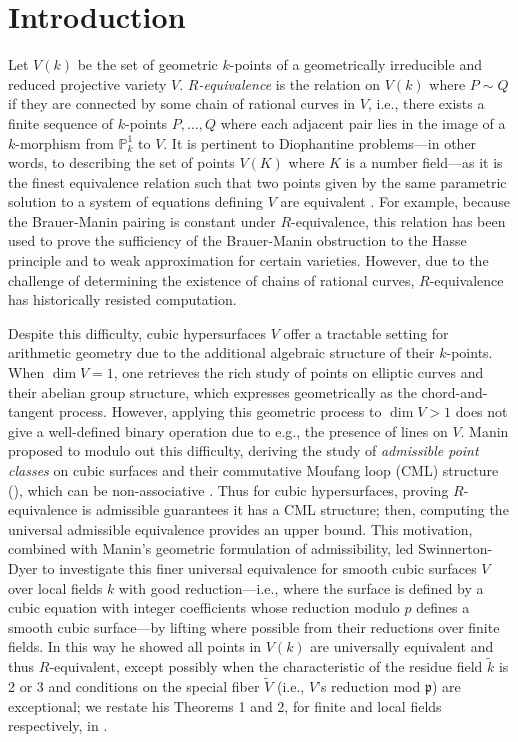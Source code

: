 \documentclass[11pt]{article}
\theoremstyle{definition}
\newcommand{\PP}{\mathbb{P}}
\begin{document}
\section{Introduction}

Let $V(k)$ be the set of geometric $k$-points of a geometrically irreducible and reduced projective variety $V$. \textit{$R$-equivalence} is the relation on $V(k)$ where $P \sim Q$ if they are connected by some  chain of rational curves in $V$, i.e., there exists a finite sequence of $k$-points $P, \dotsc, Q$ where each adjacent pair lies in the image of a $k$-morphism from $\PP^1_k$ to $V$. It is pertinent to Diophantine problems---in other words, to describing the set of points $V(K)$ where $K$ is a number field---as it is the finest equivalence relation such that two points given by the same parametric solution to a system of equations defining $V$ are equivalent \cite{diophantine}. For example, because the Brauer-Manin pairing is constant under $R$-equivalence, this relation has been used to prove the sufficiency of the Brauer-Manin obstruction to the Hasse principle \cite[\S VI]{manin3} and to weak approximation \cite{weak-approx} for certain varieties. However, due to the challenge of determining the existence of chains of rational curves, $R$-equivalence has historically resisted computation.

Despite this difficulty, cubic hypersurfaces $V$ offer a tractable setting for arithmetic geometry due to the additional algebraic structure of their $k$-points. When $\dim V = 1$, one retrieves the rich study of points on elliptic curves and their abelian group structure, which expresses geometrically as the chord-and-tangent process. However, applying this geometric process to $\dim V > 1$ does not give a well-defined binary operation due to e.g., the presence of lines on $V$. Manin \cite{manin1968cubic} proposed to modulo out this difficulty, deriving the study of \textit{admissible point classes} on cubic surfaces and their commutative Moufang loop (CML) structure (), which can be non-associative \cite{dknonassoc}. Thus for cubic hypersurfaces, proving $R$-equivalence is admissible guarantees it has a CML structure; then, computing the universal admissible equivalence provides an upper bound. This motivation, combined with Manin's geometric formulation of admissibility, led Swinnerton-Dyer \cite{swinnertondyer} to investigate this finer universal equivalence for smooth cubic surfaces $V$ over local fields $k$ with good reduction—i.e., where the surface is defined by a cubic equation with integer coefficients whose reduction modulo $p$ defines a smooth cubic surface—by lifting where possible from their reductions over finite fields. In this way he showed all points in $V(k)$ are universally equivalent and thus $R$-equivalent, except possibly when the characteristic of the residue field $\tilde{k}$ is 2 or 3 and conditions on the special fiber $\tilde{V}$ (i.e., $V$'s reduction mod $\mathfrak{p}$) are exceptional; we restate his Theorems 1 and 2, for finite and local fields respectively, in .
\end{document}
